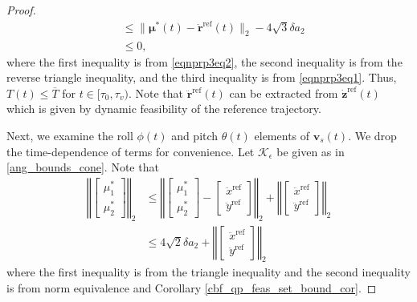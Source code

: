 \documentclass[journal,10pt]{IEEEtran}
\newcommand{\vect}[1]{\boldsymbol{\mathbf{#1}}}
\newcommand{\mat}[1]{\begin{bmatrix} #1 \end{bmatrix}}
\newcommand{\lv}{\left\Vert}
\newcommand{\rv}{\right\Vert}
\newif\ifdraft
\newcommand{\XX}[1]{\ifdraft{\color{red}[{\bf XX}: #1]}\fi}
\newcommand{\VF}[1]{\ifdraft{\color{blue}[{\bf VF}: #1]}\fi}
\begin{document}
\begin{proof}
\begin{align*}
    &\leq \|\vect{\mu}^*(t)-\ddot{\vect{r}}^{\text{ref}}(t)\|_2-4\sqrt{3}\delta a_2 \\
    &\leq 0,
\end{align*}
where the first inequality is from \eqref{eqnprp3eq2}, the second inequality is from the reverse triangle inequality, and the third inequality is from \eqref{eqnprp3eq1}. Thus, $T(t)\leq \overline{T}$ for $t\in[\tau_0,\tau_v)$. Note that $\ddot{\vect{r}}^{\text{ref}}(t)$ can be extracted from $\dot{\vect{z}}^{\text{ref}}(t)$ which is given by dynamic feasibility of the reference trajectory. 

Next, we examine the roll $\phi(t)$ and pitch $\theta(t)$ elements of $\vect{v}_s(t)$. We drop the time-dependence of terms for convenience. Let $\mathcal{K}_{\epsilon}$ be given as in \eqref{ang_bounds_cone}. 
Note that
\begin{align}
\lv\mat{\mu^*_1\\\mu^*_2}\rv_2&\leq \lv\mat{\mu^*_1\\\mu^*_2}-\mat{\ddot x^{\text{ref}}\\\ddot y^{\text{ref}}}\rv_{2}+\lv\mat{\ddot x^{\text{ref}}\\\ddot y^{\text{ref}}}\rv_2\nonumber\\
&\leq 4\sqrt{2}\delta a_2+\lv\mat{\ddot x^{\text{ref}}\\\ddot y^{\text{ref}}}\rv_2\label{ineqAep}
\end{align}
where the first inequality is from the 
triangle inequality and the second inequality is from norm equivalence and Corollary \ref{cbf_qp_feas_set_bound_cor}.

\end{proof}
\end{document}
